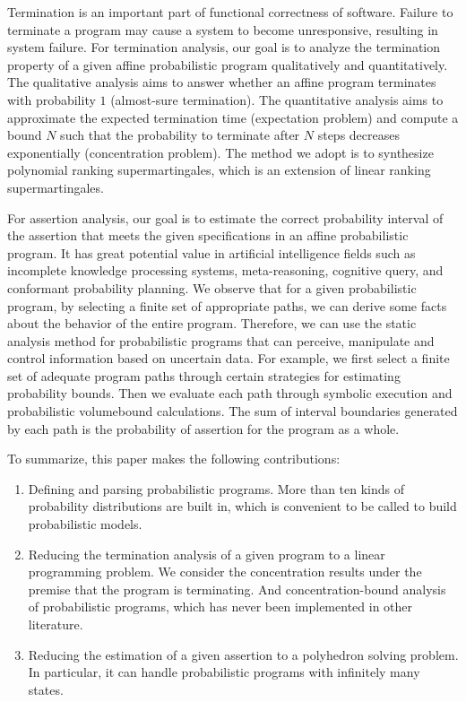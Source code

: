 \documentclass[conference]{IEEEtran}
\begin{document}
Termination is an important part of  functional correctness of software. Failure to terminate a program may cause a system to become unresponsive, resulting in system failure. For termination analysis, our goal is to analyze the termination property of a given affine probabilistic program qualitatively and quantitatively. The qualitative analysis aims to answer whether an affine program terminates with probability $1$ (almost-sure termination). The quantitative analysis aims to approximate the expected termination time (expectation problem) and compute a bound $N$ such that the probability to terminate after $N$ steps decreases exponentially (concentration problem). The method we adopt is to synthesize polynomial ranking supermartingales, which is an extension of linear ranking supermartingales. 

For assertion analysis, our goal is to estimate the correct probability interval of the assertion that meets the given specifications in an affine probabilistic program. It has great potential value in artificial intelligence fields such as incomplete knowledge processing systems, meta-reasoning, cognitive query, and conformant probability planning. 
We observe that for a given probabilistic program, by selecting a finite set of appropriate paths, we can derive some facts about the behavior of the entire program. Therefore, we can use the static analysis method for probabilistic programs that can perceive, manipulate and control information based on uncertain data. For example, we first select a finite set of adequate program paths through certain strategies for estimating probability bounds. Then we evaluate each path through symbolic execution and probabilistic volumebound calculations. The sum of interval boundaries generated by each path is the probability of assertion for the program as a whole.

To summarize, this paper makes the following contributions:
\begin{enumerate}
	\item Defining and parsing probabilistic programs. More than ten kinds of probability distributions are built in, which is convenient to be called to build probabilistic models.
	\item Reducing the termination analysis of a given program to a linear programming problem. We consider the concentration results under the premise that the program is terminating. And concentration-bound analysis of probabilistic programs, which has never been implemented in other literature.
	\item Reducing the estimation of a given assertion to a polyhedron solving problem. In particular, it can handle probabilistic programs with infinitely many states.	
\end{enumerate}
\end{document}
